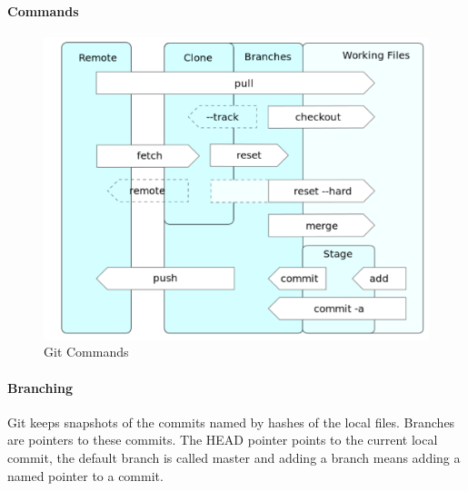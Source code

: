 \paragraph{Commands}
\begin{figure}[H]
  \centering
  \includegraphics[width=.8\textwidth]{images/git_commands.png}
  \caption{Git Commands}
\end{figure}

\paragraph{Branching}
Git keeps snapshots of the commits named by hashes of the local files.
Branches are pointers to these commits.
The HEAD pointer points to the current local commit, the default branch is called master and adding a branch means adding a named pointer to a commit.

